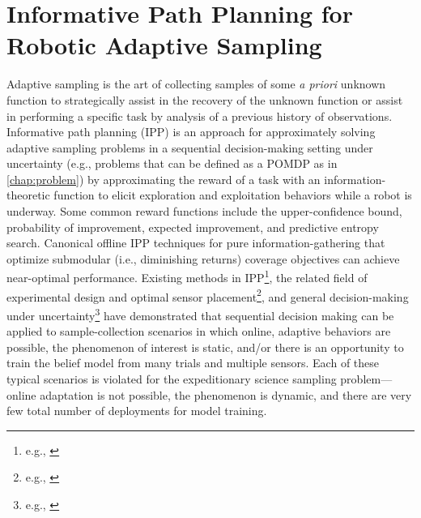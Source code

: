 \section{Informative Path Planning for Robotic Adaptive Sampling}
\label{sec:ipp}
Adaptive sampling is the art of collecting samples of some \emph{a priori} unknown function to strategically assist in the recovery of the unknown function or assist in performing a specific task by analysis of a previous history of observations. Informative path planning (IPP) is an approach for approximately solving adaptive sampling problems in a sequential decision-making setting under uncertainty (e.g., problems that can be defined as a POMDP as in \cref{chap:problem}) by approximating the reward of a task with an information-theoretic function to elicit exploration and exploitation behaviors while a robot is underway. Some common reward functions include the upper-confidence bound\autocite{agrawal1995sample,auer2002using,snoek2012practical}, probability of improvement\autocite{snoek2012practical,kushner1964new}, expected improvement\autocite{snoek2012practical,jones1998efficient}, and predictive entropy search\autocite{hennig2012entropy,hernandez2014predictive}. Canonical offline IPP techniques for pure information-gathering that optimize submodular (i.e., diminishing returns) coverage objectives can achieve near-optimal performance\autocite{Srinivas2012, binney2012branch}. Existing methods in IPP\footnote{e.g., \autocite{Hitz2017,hollinger2013sampling,flaspohler2019information,levine2010information,binney2012branch}}, the related field of experimental design and optimal sensor placement\footnote{e.g., \autocite{krause2008near,wang2019reinforcement}}, and general decision-making under uncertainty\footnote{e.g., \autocite{sunberg2018online, somani2013despot, kocsis2006bandit, Silver2010}} have demonstrated that sequential decision making can be applied to sample-collection scenarios in which online, adaptive behaviors are possible, the phenomenon of interest is static, and/or there is an opportunity to train the belief model from many trials and multiple sensors. Each of these typical scenarios is violated for the expeditionary science sampling problem---online adaptation is not possible, the phenomenon is dynamic, and there are very few total number of deployments for model training.

